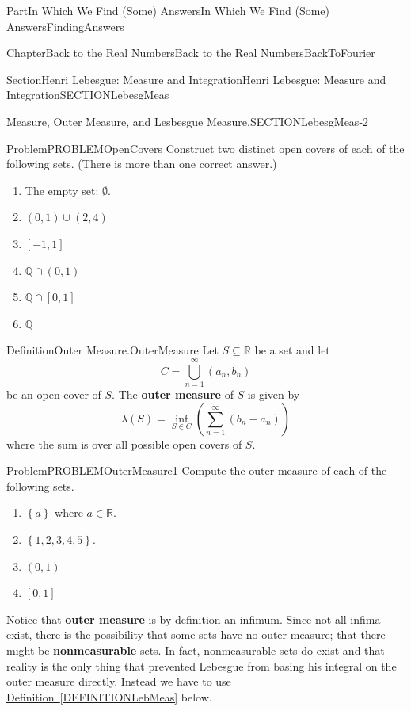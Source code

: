 \documentclass[oneside,10pt,]{book}
\newcommand{\xreffont}{\relax}
\newcommand{\terminology}[1]{\textbf{#1}}
\numberwithin{equation}{part}
\newcommand{\RR}{\mathbb {R}}
\newcommand{\QQ}{\mathbb {Q}}
\begin{document}
\begin{partptx}{Part}{In Which We Find (Some) Answers}{}{In Which We Find (Some) Answers}{}{}{FindingAnswers}
\begin{chapterptx}{Chapter}{Back to the Real Numbers}{}{Back to the Real Numbers}{}{}{BackToFourier}
\begin{sectionptx}{Section}{Henri Lebesgue: Measure and Integration}{}{Henri Lebesgue: Measure and Integration}{}{}{SECTIONLebesgMeas}
\begin{paragraphs}{Measure, Outer Measure, and  Lesbesgue Measure.}{SECTIONLebesgMeas-2}
\begin{problem}{Problem}{}{PROBLEMOpenCovers}%
Construct two distinct open covers of each of the following sets. (There is more than one correct answer.)%
\begin{enumerate}[font=\bfseries,label=(\alph*),ref=\alph*]%
\item{}The empty set: \(\emptyset \).%
\item{}\((0,1)\cup{} (2,4)\)%
\item{}\([-1,1]\)%
\item{}\(\QQ\cap(0,1) \)%
\item{}\(\QQ\cap [0,1]  \)%
\item{}\(\QQ{}\)%
\end{enumerate}%
\end{problem}
\begin{definition}{Definition}{Outer Measure.}{OuterMeasure}%
Let \(S\subseteq\RR \) be a set and let%
\begin{equation*}
C=\bigcup_{n=1}^\infty (a_n,b_n)
\end{equation*}
be an open cover of \(S\). The \terminology{outer measure} of \(S\) is given by%
\begin{equation*}
\lambda (S)= \inf_{S\in C}\left({}\sum_{n=1}^\infty (b_n-a_n)\right)  
\end{equation*}
where the sum is over all possible open covers of \(S\).%
\end{definition}
\begin{problem}{Problem}{}{PROBLEMOuterMeasure1}%
Compute the \hyperref[OuterMeasure]{outer measure} of each of the following sets.%
\begin{enumerate}[font=\bfseries,label=(\alph*),ref=\alph*]%
\item{}\(\left\{a\right\} \) where \(a\in \RR{}\).%
\item{}\(\left\{1, 2, 3, 4, 5\right\} \).%
\item{}\((0,1)\)%
\item{}\([0,1]\)%
\end{enumerate}%
\end{problem}
Notice that \terminology{outer measure} is by definition an infimum. Since not all infima exist, there is the possibility that some sets have no outer measure; that there might be \terminology{non\textendash{}measurable} sets. In fact, non\textendash{}measurable sets do exist and that reality is the only thing that prevented Lebesgue from basing his integral on the outer measure directly. Instead we have to use \hyperref[DEFINITIONLebMeas]{Definition~{\xreffont\ref{DEFINITIONLebMeas}}} below.%

\end{paragraphs}
\end{sectionptx}
\end{chapterptx}
\end{partptx}
\end{document}

